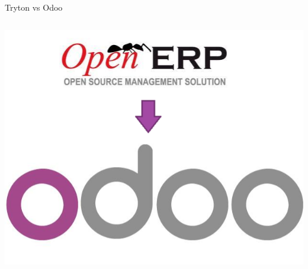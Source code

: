 \begin{frame}{Tryton vs Odoo}
\begin{columns}
\begin{center}
                \includegraphics[width=\textwidth]{./Images/openerp-odoo.png}
            \end{center}
        \end{columns}
	\end{frame}
